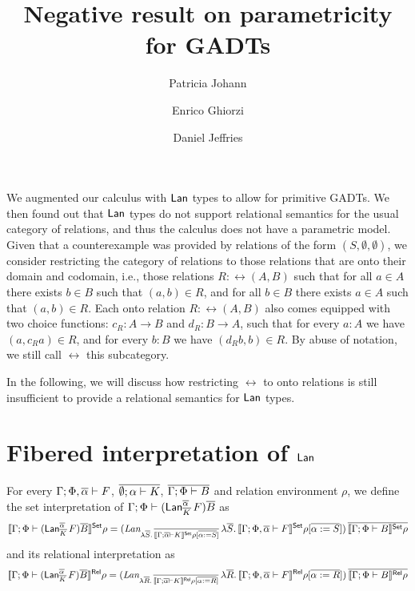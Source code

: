 \documentclass{lmcs}
\theoremstyle{plain}\newtheorem{satz}[thm]{Satz}
\begin{document}
\title[Negative result on parametricity for GADTs]{Negative result on parametricity for GADTs}

\author[P.~Johann]{Patricia Johann}	
\address{Appalachian State University}	

\author[E.~Ghiorzi]{Enrico Ghiorzi}	
\address{Appalachian State University}	

\author[D.~Jeffries]{Daniel Jeffries}	
\address{Appalachian State University}	

\maketitle



We augmented our calculus with $\mathsf{Lan}$ types to allow for primitive GADTs.
We then found out that $\mathsf{Lan}$ types do not support relational semantics for the usual category of relations, and thus the calculus does not have a parametric model.
Given that a counterexample was provided by relations of the form $(S, \emptyset, \emptyset)$, we consider restricting the category of relations to those relations that are onto their domain and codomain, i.e., those relations $R: \rel(A, B)$ such that for all $a \in A$ there exists $b \in B$ such that $(a, b) \in R$, and for all $b \in B$ there exists $a \in A$ such that $(a, b) \in R$.
Each onto relation $R: \rel(A, B)$ also comes equipped with two choice functions: $c_R : A \to B$ and $d_R : B \to A$, such that for every $a : A$ we have $(a, c_R a) \in R$, and for every $b : B$ we have $(d_R b, b) \in R$.
By abuse of notation, we still call $\rel$ this subcategory.

In the following, we will discuss how restricting $\rel$ to onto relations is still insufficient to provide a relational semantics for $\mathsf{Lan}$ types.



\section{Fibered interpretation of $\mathsf{Lan}$}

For every $\Gamma; \Phi, \overline{\alpha} \vdash F$, $\overline{\emptyset; \alpha \vdash K}$, $\overline{\Gamma; \Phi \vdash B}$ and relation environment $\rho$, we define the set interpretation of $\Gamma;\Phi \vdash (\mathsf{Lan}^{\overline{\alpha}}_{\overline{K}}\,F)\overline{B}$ as
\[
  \llbracket{\Gamma;\Phi \vdash
    (\mathsf{Lan}^{\overline{\alpha}}_{\overline{K}}\,F)\overline{B}}\rrbracket^{\mathsf{Set}}\rho = (
  \textit{Lan}_{\lambda \overline{S}.\,\overline{\llbracket{\Gamma; \overline{\alpha} \vdash K}\rrbracket^{\mathsf{Set}}
      \rho[\overline{\alpha := S}]}}\, \lambda \overline{S}.\,\llbracket{\Gamma; \Phi, \overline{\alpha}
    \vdash F}\rrbracket^{\mathsf{Set}} \rho[\overline{\alpha := S}])\, \overline{\llbracket{\Gamma; \Phi
      \vdash B}\rrbracket^{\mathsf{Set}}\rho}
\]
and its relational interpretation as
\[
  \llbracket{\Gamma;\Phi \vdash
    (\mathsf{Lan}^{\overline{\alpha}}_{\overline{K}}\,F)\overline{B}}\rrbracket^{\mathsf{Rel}}\rho = (
  \textit{Lan}_{\lambda \overline{R}.\,\overline{\llbracket{\Gamma; \overline{\alpha} \vdash
        K}\rrbracket^{\mathsf{Rel}}\rho[\overline{\alpha := R}]}}\, \lambda \overline{R}.\,\llbracket{\Gamma;
    \Phi, \overline{\alpha} \vdash F}\rrbracket^{\mathsf{Rel}}\rho[\overline{\alpha := R}])\,
  \overline{\llbracket{\Gamma; \Phi \vdash B}\rrbracket^{\mathsf{Rel}}\rho}
\]
\end{document}
